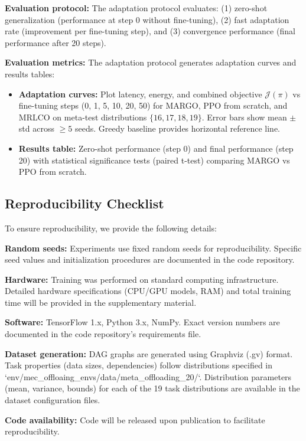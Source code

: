 \documentclass[journal,twoside]{IEEEtran}
\newcommand{\method}{\textsc{MARGO}}
\newcommand{\baseline}{\textsc{MRLCO}}
\begin{document}
\textbf{Evaluation protocol:} The adaptation protocol evaluates: (1) zero-shot generalization (performance at step 0 without fine-tuning), (2) fast adaptation rate (improvement per fine-tuning step), and (3) convergence performance (final performance after 20 steps). 

\textbf{Evaluation metrics:} The adaptation protocol generates adaptation curves and results tables:
\begin{itemize}
    \item \textbf{Adaptation curves:} Plot latency, energy, and combined objective $\mathcal{J}(\pi)$ vs fine-tuning steps (0, 1, 5, 10, 20, 50) for \method{}, PPO from scratch, and \baseline{} on meta-test distributions $\{16, 17, 18, 19\}$. Error bars show mean $\pm$ std across $\geq 5$ seeds. Greedy baseline provides horizontal reference line.
    \item \textbf{Results table:} Zero-shot performance (step 0) and final performance (step 20) with statistical significance tests (paired t-test) comparing \method{} vs PPO from scratch.
\end{itemize}

\subsection{Reproducibility Checklist}

To ensure reproducibility, we provide the following details:

\textbf{Random seeds:} Experiments use fixed random seeds for reproducibility. Specific seed values and initialization procedures are documented in the code repository.

\textbf{Hardware:} Training was performed on standard computing infrastructure. Detailed hardware specifications (CPU/GPU models, RAM) and total training time will be provided in the supplementary material.

\textbf{Software:} TensorFlow 1.x, Python 3.x, NumPy. Exact version numbers are documented in the code repository's requirements file.

\textbf{Dataset generation:} DAG graphs are generated using Graphviz (.gv) format. Task properties (data sizes, dependencies) follow distributions specified in `env/mec_offloaing_envs/data/meta_offloading_20/`. Distribution parameters (mean, variance, bounds) for each of the 19 task distributions are available in the dataset configuration files.

\textbf{Code availability:} Code will be released upon publication to facilitate reproducibility.
\end{document}
